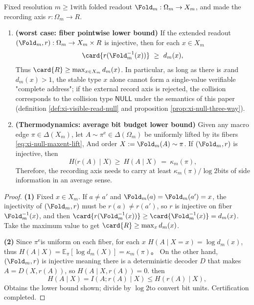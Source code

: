 \begin{theorem}\label{thm:address-defect-law}
Fixed resolution \(m\ge 1\) ​​with folded readout \(\Fold_m:\Omega_m\to X_m\), and made the recording axis \(r:\Omega_m\to R\).
\begin{enumerate}
  \item ​​\textbf{(worst case: fiber pointwise lower bound)}
  If the extended readout \((\Fold_m,r):\Omega_m\to X_m\times R\) ​​is injective, then for each \(x\in X_m\)
  \[
  \card{r(\Fold_m^{-1}(x))}\ \ge\ d_m(x),
  \]
  Thus \(\card{R}\ge \max_{x\in X_m} d_m(x)\).
  In particular, as long as there is \(x\) ​​and \(d_m(x)>1\), the stable type \(x\) alone cannot form a single-value verifiable "complete address"; if the external record axis is rejected, the collision corresponds to the collision type \(\mathsf{NULL}\) under the semantics of this paper (definition \ref{def:xi-visible-read-null} and proposition \ref{prop:xi-null-three-way}).

  \item ​​\textbf{(Thermodynamics: average bit budget lower bound)}
  Given any macro edge \(\pi\in\Delta(X_m)\), let \(A\sim\pi^{\mathrm{e}}\in\Delta(\Omega_m)\) be uniformly lifted by its fibers \eqref{eq:xi-null-maxent-lift},
  And order \(X:=\Fold_m(A)\sim\pi\).
  If \((\Fold_m,r)\) ​​is injective, then
  \[
  H\bigl(r(A)\mid X\bigr)\ \ge\ H(A\mid X)\ =\ \kappa_m(\pi),
  \]
  Therefore, the recording axis needs to carry at least \(\kappa_m(\pi)/\log 2\) ​​bits of side information in an average sense.
\end{enumerate}
\end{theorem}

\begin{proof}
\textbf{(1)} Fixed \(x\in X_m\). If \(a\neq a'\) and \(\Fold_m(a)=\Fold_m(a')=x\), the injectivity of \((\Fold_m,r)\) must be \(r(a)\neq r(a')\), so \(r\) is injective on fiber \(\Fold_m^{-1}(x)\), and then \(\card{r(\Fold_m^{-1}(x))}\ge \card{\Fold_m^{-1}(x)}=d_m(x)\). Take the maximum value to get \(\card{R}\ge \max_x d_m(x)\).
\par
\textbf{(2)} Since \(\pi^{\mathrm{e}}\) ​​is uniform on each fiber, for each \(x\)
\(
H(A\mid X=x)=\log d_m(x)
\), thus
\(
H(A\mid X)=\mathbb{E}_\pi[\log d_m(X)]=\kappa_m(\pi)
\)。
On the other hand, \((\Fold_m,r)\) ​​is injective meaning there is a deterministic decoder \(D\) that makes \(A=D(X,r(A))\), so \(H(A\mid X,r(A))=0\).
then
\[
H(A\mid X)=I(A;r(A)\mid X)\le H(r(A)\mid X),
\]
Obtains the lower bound shown; divide by \(\log 2\) ​​to convert bit units. Certification completed.
\end{proof}

